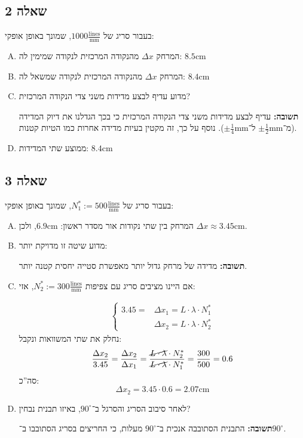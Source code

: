 \documentclass[]{../../../tex/classes/styledArticle}
\renewcommand\lg{\lambda}
\newcommand\cm{\mathrm{cm}}
\newcommand\mrm[1]{\mathrm{#1}}
\begin{document}
	\subsection{שאלה 2}
	בעבור סריג של $1000\frac{\mathrm{lines}}{\mathrm{mm}}$, שמונך באופן אופקי: 
	\begin{enumerate}[(A)]
		\item המרחק $\Delta x$ מהנקודה המרכזית לנקודה שמימין לה: $\bm{8.5\cm}$
		\item המרחק $\Delta x$ מהנקודה המרכזית לנקודה שמשאל לה: $\bm{8.4\cm}$
		\item מדוע עדיף לבצע מדידות משני צדי הנקודה המרכזית? 
		
		\textbf{תשובה: }עדיף לבצע מדידות משני צדי הנקודה המרכזית כי בכך הגדלנו את דיוק המדידה (מ־$\pm \frac{1}{2}\mrm{mm}$ ל־$\pm \frac{1}{4}\mrm{mm}$). נוסף על כך, זה מקטין בעיות מדידה אחרות כמו הטיות קטנות. 
		
		\item ממוצע שתי המדידות: $\bm{8.4\cm}$
	\end{enumerate}
	
	\subsection{שאלה 3}
	בעבור סריג של $N^*_1 := 500\frac{\mathrm{lines}}{\mathrm{mm}}$, שמונך באופן אופקי: 
	\begin{enumerate}[(A)]
		\item המרחק בין שתי נקודות אור מסדר ראשון: $\bm{6.9\cm}$, ולכן $\Delta x \approx \bm{3.45\cm}$. 
		\item מדוע שיטה זו מדויקת יותר: 
		
		\textbf{תשובה: }מדידה של מרחק גדול יותר מאפשרת סטייה יחסית קטנה יותר. 
		
		
		\item אם היינו מציבים סריג עם צפיפות $N^*_2 := 300\frac{\mathrm{lines}}{\mathrm{mm}}$, אזי: 
		
		\begin{align*}
			\begin{cases}
				3.45 = &\!\!\!\!\Delta x_1 = L \cdot \lg \cdot N^*_1 \\
				&\!\!\!\!\Delta x_2 = L \cdot \lg \cdot N_2^*
			\end{cases}
		\end{align*}
		נחלק את שתי המשוואות ונקבל: 
		\[ \frac{\Delta x_2}{3.45} = \frac{\Delta x_2}{\Delta x_1} = \frac{\cancel{L \cdot \lg} \cdot N^*_2}{\cancel{L \cdot \lg} \cdot N_1^*} = \frac{300}{500} = 0.6 \]
		סה''כ: 
		\[ \Delta x_2 = 3.45 \cdot 0.6 = 2.07\cm \]
		\item לאחר סיבוב הסריג והסרגל ב־$90^{\circ}$, באיזו תבנית נבחין? 
		
		\textbf{תשובה: }התבנית הסתובבה אנכית ב־$90^{\circ}$ מעלות, כי החריצים בסריג הסתובבו ב־$90^{\circ}$. 
	\end{enumerate}
	
\end{document}
